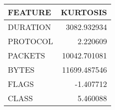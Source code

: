 \begin{tabular}{lr}
\toprule
 FEATURE &     KURTOSIS \\
\midrule
DURATION &  3082.932934 \\
PROTOCOL &     2.220609 \\
 PACKETS & 10042.701081 \\
   BYTES & 11699.487546 \\
   FLAGS &    -1.407712 \\
   CLASS &     5.460088 \\
\bottomrule
\end{tabular}
